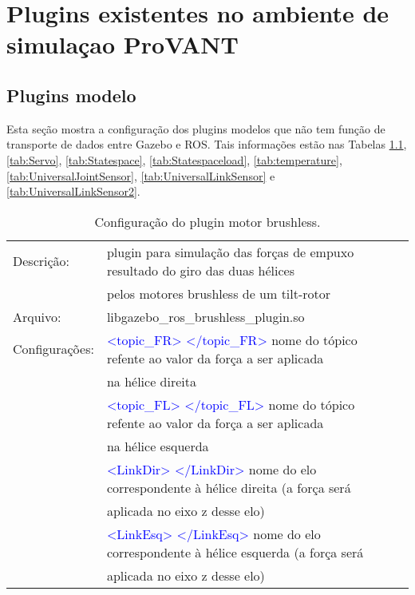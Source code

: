 \chapter{Plugins existentes no ambiente de simulaçao ProVANT}
\label{pluginsAp}

\section{Plugins modelo}

Esta seção mostra a configuração dos plugins modelos que não tem função de transporte de dados entre Gazebo e ROS. Tais informações estão nas Tabelas \ref{tab:Brushless}, \ref{tab:Servo}, \ref{tab:Statespace}, \ref{tab:Statespaceload},
	\ref{tab:temperature}, \ref{tab:UniversalJointSensor}, \ref{tab:UniversalLinkSensor} e \ref{tab:UniversalLinkSensor2}.
	\begin{table}[h]
	\centering
	\begin{tabular}{|r|lrrr|}
	\hline
	\multicolumn{1}{|l|}{Descrição:} &  plugin para simulação das forças de empuxo resultado do giro das duas hélices  &       &       &         \\
	& pelos motores brushless de um tilt-rotor &       &       &           \\
	\hline
	\multicolumn{1}{|l|}{Arquivo:} &  libgazebo\_ros\_brushless\_plugin.so &       &       &            \\
	\hline
	\multicolumn{1}{|l|}{Configurações: } & \textcolor{blue}{<topic\_FR> </topic\_FR>}  nome do tópico refente ao valor da força a ser aplicada
	&       &       &      \\
	& na hélice direita &       &       &        \\
	&  \textcolor{blue}{<topic\_FL> </topic\_FL>}  nome do tópico refente ao valor da força a ser aplicada &       &       &        \\
	& na hélice esquerda &       &       &       \\
	& \textcolor{blue}{<LinkDir> </LinkDir>}  nome do elo correspondente à hélice direita (a força será &       &       &        \\
	& aplicada no eixo z desse elo) &       &       &        \\
	& \textcolor{blue}{<LinkEsq> </LinkEsq>}   nome do elo correspondente à hélice esquerda (a força será   &       &       &       \\
	& aplicada no eixo z desse elo) &       &       &     \\
	\hline
	\end{tabular}%
	\caption{Configuração do plugin motor brushless.}
	\label{tab:Brushless}%
	\end{table}%
